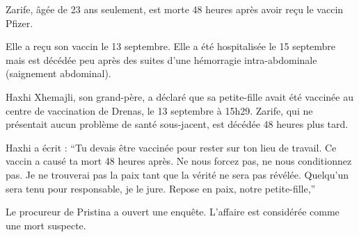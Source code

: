 Zarife, âgée de 23 ans seulement, est morte 48 heures après avoir reçu le vaccin
Pfizer.

Elle a reçu son vaccin le 13 septembre. Elle a été hospitalisée le 15 septembre
mais est décédée peu après des suites d'une hémorragie intra-abdominale
(saignement abdominal).

Haxhi Xhemajli, son grand-père, a déclaré que sa petite-fille avait été vaccinée
au centre de vaccination de Drenas, le 13 septembre à 15h29. Zarife, qui ne
présentait aucun problème de santé sous-jacent, est décédée 48 heures plus tard.

Haxhi a écrit : “Tu devais être vaccinée pour rester sur ton lieu de travail. Ce
vaccin a causé ta mort 48 heures après. Ne nous forcez pas, ne nous conditionnez
pas. Je ne trouverai pas la paix tant que la vérité ne sera pas
révélée. Quelqu'un sera tenu pour responsable, je le jure. Repose en paix, notre
petite-fille,”

Le procureur de Pristina a ouvert une enquête. L'affaire est considérée comme
une mort suspecte.


